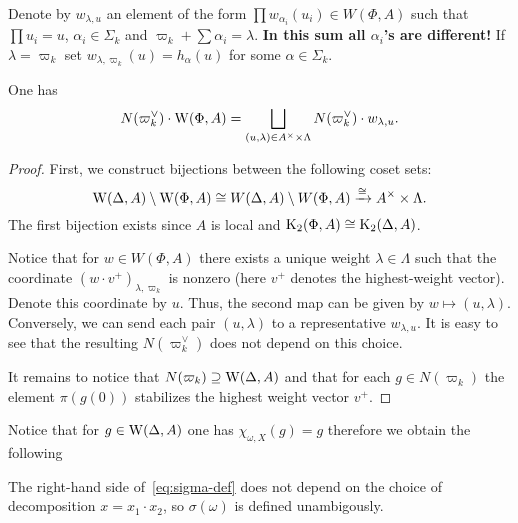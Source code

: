 Denote by $w_{\lambda, u}$ an element of the form $\prod w_{\alpha_i}(u_i) \in W(\Phi, A)$ such that $\prod u_i = u$, $\alpha_i \in \Sigma_k$ and $\varpi_k + \sum \alpha_i = \lambda$.
{\bf In this sum all $\alpha_i$'s are different!}
If $\lambda = \varpi_k$ set $w_{\lambda, \varpi_k}(u) = h_\alpha(u)$ for some $\alpha \in \Sigma_k$.


\begin{lemma} \label{lem:can-repr} One has \[N(\varpi_k^\vee) \cdot \operatorname{W}(\Phi, A) = \bigsqcup\limits_{(u, \lambda) \in A^\times \times \Lambda} N(\varpi_k^\vee) \cdot w_{\lambda, u}. \]
\end{lemma}
\begin{proof}
 First, we construct bijections between the following coset sets:
 \begin{equation}\label{eq:repr} \operatorname{W}(\Delta, A) \setminus \operatorname{W}(\Phi, A) \cong W(\Delta, A) \setminus W(\Phi, A) \xrightarrow{\cong} A^\times \times \Lambda.\end{equation}
 The first bijection exists since $A$ is local and $\operatorname{K}_2(\Phi, A) \cong \operatorname{K}_2(\Delta, A)$.

 Notice that for $w \in W(\Phi, A)$ there exists a unique weight $\lambda \in \Lambda$ such that the coordinate $(w \cdot v^+)_{\lambda, \varpi_k}$ is nonzero (here $v^+$ denotes the highest-weight vector). Denote this coordinate by $u$. Thus, the second map can be given by $w \mapsto (u, \lambda)$. Conversely, we can send each pair $(u, \lambda)$ to a representative $w_{\lambda, u}$. It is easy to see that the resulting $N(\varpi_k^\vee)$ does not depend on this choice.


 It remains to notice that $N(\varpi_k) \supseteq \operatorname{W}(\Delta, A)$ and that for each $g \in N(\varpi_k)$ the element $\pi(g(0))$ stabilizes the highest weight vector $v^+$.
\end{proof}


Notice that for $g \in \operatorname{W}(\Delta, A)$ one has $\chi_{\omega, X}(g) = g$ therefore we obtain the following
\begin{cor}
 The right-hand side of~\eqref{eq:sigma-def} does not depend on the choice of decomposition $x = x_1 \cdot x_2$, so $\sigma(\omega)$ is defined unambigously.
\end{cor}



